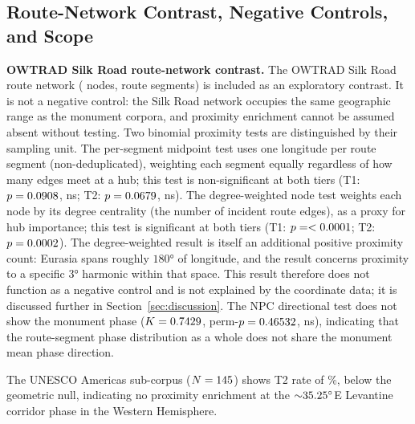 \documentclass[12pt,a4paper]{article}
\newcommand{\degr}{\ifmmode^\circ\else\textdegree{}\fi}
\begin{document}
\subsection{Route-Network Contrast, Negative Controls, and Scope}

\textbf{OWTRAD Silk Road route-network contrast.}
The OWTRAD Silk Road route network (\npcNOwtrad{} nodes, \NOwtradEdges{} route segments)
is included as an exploratory contrast. It is not a negative control: the Silk Road
network occupies the same geographic range as the monument corpora, and proximity
enrichment cannot be assumed absent without testing. Two binomial
proximity tests are distinguished by their sampling unit. The per-segment midpoint
test uses one longitude per route segment (non-deduplicated), weighting each segment
equally regardless of how many edges meet at a hub; this test is non-significant at
both tiers (T1: $p = 0.0908{}$, ns; T2: $p = 0.0679{}$, ns). The
degree-weighted node test weights each node by its degree centrality (the number of
incident route edges), as a proxy for hub importance; this test is significant at both
tiers (T1: $p = < 0.0001{}$; T2: $p = 0.0002{}$). The degree-weighted
result is itself an additional positive proximity count: Eurasia spans roughly $180°$ of
longitude, and the result concerns proximity to a specific $3°$ harmonic
within that space. This result therefore does not function as
a negative control and is not explained by the coordinate data; it is discussed further in Section~\ref{sec:discussion}. The NPC directional test does not
show the monument phase ($K = 0.7429{}$, perm-$p =
0.46532{}$, ns), indicating that the route-segment phase distribution as a
whole does not share the monument mean phase direction.

The UNESCO Americas sub-corpus ($N = 145{}$) shows T2
rate of \AmericasApRate\%, below the \NullRateAp{} geometric null, indicating
no proximity enrichment at the ${\sim}35.25\degr$E Levantine corridor
phase in the Western Hemisphere.
\end{document}
